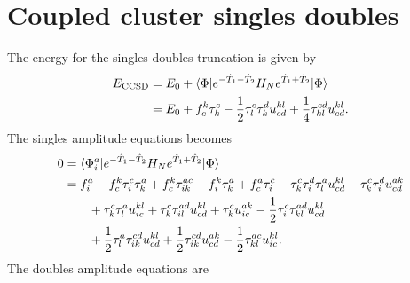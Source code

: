     \section{Coupled cluster singles doubles}
        The energy for the singles-doubles truncation is given by
        \begin{align}
            E_{\text{CCSD}}
            &= E_{0}
            + \langle \Phi | e^{-\hat{T}_1 - \hat{T}_2} H_N e^{\hat{T}_1 + \hat{T}_2}
            | \Phi \rangle
            \\
            &=
            E_{0}
            +
            f^{k}_{c} \tau^{c}_{k}
            - \frac{1}{2} \tau^{c}_{l} \tau^{d}_{k} u^{kl}_{cd}
            + \frac{1}{4} \tau^{cd}_{kl} u^{kl}_{cd}.
        \end{align}
        The singles amplitude equations becomes
        \begin{align}
            0 & = \langle \Phi^{a}_{i} | e^{-\hat{T}_1 - \hat{T}_2} H_N
            e^{\hat{T}_1 + \hat{T}_2}| \Phi \rangle
            \\
            &=
            f^{a}_{i}
            - f^{k}_{c} \tau^{c}_{i} \tau^{a}_{k}
            + f^{k}_{c} \tau^{ac}_{ik}
            - f^{k}_{i} \tau^{a}_{k}
            + f^{a}_{c} \tau^{c}_{i}
            - \tau^{c}_{k} \tau^{d}_{i} \tau^{a}_{l} u^{kl}_{cd}
            - \tau^{c}_{k} \tau^{d}_{i} u^{ak}_{cd}
            \nonumber \\
            &\qquad
            + \tau^{c}_{k} \tau^{a}_{l} u^{kl}_{ic}
            + \tau^{c}_{k} \tau^{ad}_{il} u^{kl}_{cd}
            + \tau^{c}_{k} u^{ak}_{ic}
            - \frac{1}{2} \tau^{c}_{i} \tau^{ad}_{kl} u^{kl}_{cd}
            \nonumber \\
            &\qquad
            + \frac{1}{2} \tau^{a}_{l} \tau^{cd}_{ik} u^{kl}_{cd}
            + \frac{1}{2} \tau^{cd}_{ik} u^{ak}_{cd}
            - \frac{1}{2} \tau^{ac}_{kl} u^{kl}_{ic}.
        \end{align}
        The doubles amplitude equations are
